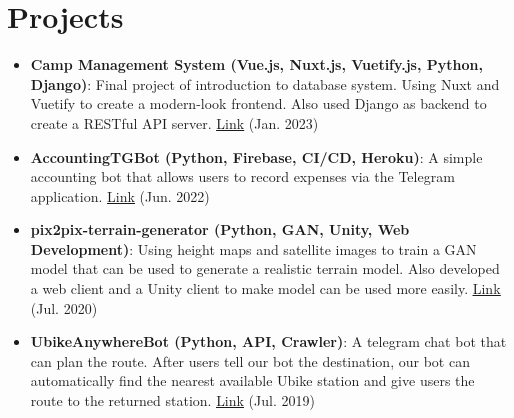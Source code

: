 \documentclass[a4paper8pt]{extarticle}
\newcommand{\resumeItem}[2]{
  \item\small{
    \textbf{#1}{: #2 \vspace{-2pt}}
  }
}
\newcommand{\resumeSubItem}[2]{\resumeItem{#1}{#2}\vspace{-3pt}}
\newcommand{\resumeSubHeadingListStart}{\begin{itemize}[leftmargin=*]}
\newcommand{\resumeSubHeadingListEnd}{\end{itemize}}
\begin{document}
\vspace{-5pt}
\section{Projects}
\resumeSubHeadingListStart
\resumeSubItem{Camp Management System (Vue.js, Nuxt.js, Vuetify.js, Python, Django)}{Final project of introduction to database system. Using Nuxt and Vuetify to create a modern-look frontend. Also used Django as backend to create a RESTful API server. \href{https://github.com/jayin92/camp-management-system}{\underline{Link}} (Jan. 2023)}
\resumeSubItem{AccountingTGBot (Python, Firebase, CI/CD, Heroku)}{A simple accounting bot that allows users to record expenses via the Telegram application. \href{https://github.com/jayin92/AccountingTGBot}{\underline{Link}} (Jun. 2022)}
\vspace{2pt}
\resumeSubItem{pix2pix-terrain-generator (Python, GAN, Unity, Web Development)}{Using height maps and satellite images to train a GAN model that can be used to generate a realistic terrain model. Also developed a web client and a Unity client to make model can be used more easily. \href{https://github.com/jayin92/pix2pix-terrain-generator}{\underline{Link}} (Jul. 2020)}
\vspace{2pt}
\resumeSubItem{UbikeAnywhereBot (Python, API, Crawler)}{A telegram chat bot that can plan the route. After users tell our bot the destination, our bot can automatically find the nearest available Ubike station and give users the route to the returned station. \href{https://github.com/jayin92/UBikeAnywhereBot}{\underline{Link}} (Jul. 2019)}
\resumeSubHeadingListEnd
\vspace{-5pt}

\end{document}
